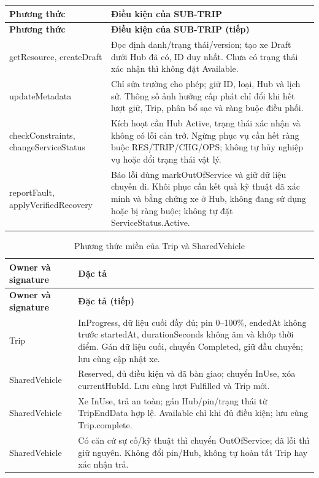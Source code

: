 \begingroup
\renewcommand{\theHtable}{owner.trip}
\begin{longtable}{|L{58mm}|L{81mm}|}
\hline
\textbf{Phương thức} & \textbf{Điều kiện của SUB-TRIP}\\\hline
\endfirsthead
\hline\textbf{Phương thức} & \textbf{Điều kiện của SUB-TRIP (tiếp)}\\\hline\endhead
getResource, createDraft & Đọc định danh/trạng thái/version; tạo xe Draft dưới Hub đã có, ID duy nhất. Chưa có trạng thái xác nhận thì không đặt Available.\\\hline
updateMetadata & Chỉ sửa trường cho phép; giữ ID, loại, Hub và lịch sử. Thông số ảnh hưởng cấp phát chỉ đổi khi hết lượt giữ, Trip, phân bổ sạc và ràng buộc điều phối.\\\hline
checkConstraints, changeServiceStatus & Kích hoạt cần Hub Active, trạng thái xác nhận và không có lỗi cản trở. Ngừng phục vụ cần hết ràng buộc RES/TRIP/CHG/OPS; không tự hủy nghiệp vụ hoặc đổi trạng thái vật lý.\\\hline
reportFault, applyVerifiedRecovery & Báo lỗi dùng markOutOfService và giữ dữ liệu chuyến đi. Khôi phục cần kết quả kỹ thuật đã xác minh và bằng chứng xe ở Hub, không đang sử dụng hoặc bị ràng buộc; không tự đặt ServiceStatus.Active.\\\hline
\end{longtable}
\addtocounter{table}{-1}
\endgroup

\begin{longtable}{|L{58mm}|L{81mm}|}
\caption{Phương thức miền của Trip và SharedVehicle}\\\hline
\textbf{Owner và signature} & \textbf{Đặc tả}\\\hline
\endfirsthead
\hline\textbf{Owner và signature} & \textbf{Đặc tả (tiếp)}\\\hline\endhead
Trip\par{} &
InProgress, dữ liệu cuối đầy đủ; pin 0--100\%, endedAt không trước startedAt, durationSeconds không âm và khớp thời điểm. Gán dữ liệu cuối, chuyển Completed, giữ đầu chuyến; lưu cùng cập nhật xe.\\\hline
SharedVehicle\par{} &
Reserved, đủ điều kiện và đã bàn giao; chuyển InUse, xóa currentHubId. Lưu cùng lượt Fulfilled và Trip mới.\\\hline
SharedVehicle\par{} &
Xe InUse, trả an toàn; gán Hub/pin/trạng thái từ TripEndData hợp lệ. Available chỉ khi đủ điều kiện; lưu cùng Trip.complete.\\\hline
SharedVehicle\par{} &
Có căn cứ sự cố/kỹ thuật thì chuyển OutOfService; đã lỗi thì giữ nguyên. Không đổi pin/Hub, không tự hoàn tất Trip hay xác nhận trả.\\\hline
\end{longtable}
